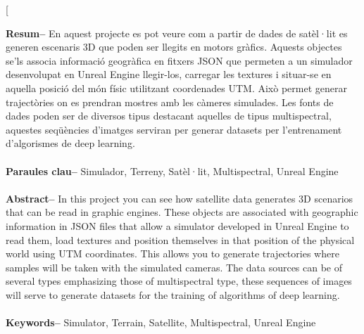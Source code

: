 \documentclass[10pt,a4paper,twocolumn,twoside]{article}
\begin{document}
\twocolumn[\begin{@twocolumnfalse}

{
\vspace*{-1cm}
\maketitle
}

\thispagestyle{primerapagina}
\begin{center}
\parbox{0.915\textwidth}
{\sffamily\small
\textbf{Resum--} En aquest projecte es pot veure com a partir de dades de satèl·lit es generen escenaris 3D que poden ser llegits en motors gràfics. Aquests objectes se'ls associa informació geogràfica en fitxers JSON que permeten a un simulador desenvolupat en Unreal Engine llegir-los, carregar les textures i situar-se en aquella posició del món físic utilitzant coordenades UTM. Això permet generar trajectòries on es prendran mostres amb les càmeres simulades. Les fonts de dades poden ser de diversos tipus destacant aquelles de tipus multispectral, aquestes seqüències d'imatges serviran per generar datasets per l'entrenament d'algorismes de deep learning.
\\
\\
\textbf{Paraules clau-- }
Simulador, Terreny, Satèl·lit, Multispectral, Unreal Engine\\
\\
\textbf{Abstract--}  In this project you can see how satellite data generates 3D scenarios that can be read in graphic engines. These objects are associated with geographic information in JSON files that allow a simulator developed in Unreal Engine to read them, load textures and position themselves in that position of the physical world using UTM coordinates. This allows you to generate trajectories where samples will be taken with the simulated cameras. The data sources can be of several types emphasizing those of multispectral type, these sequences of images will serve to generate datasets for the training of algorithms of deep learning.
\\
\\
\textbf{Keywords-- }
Simulator, Terrain, Satellite, Multispectral, Unreal Engine\\
\\
}


\end{center}
\end{@twocolumnfalse}
\end{document}
